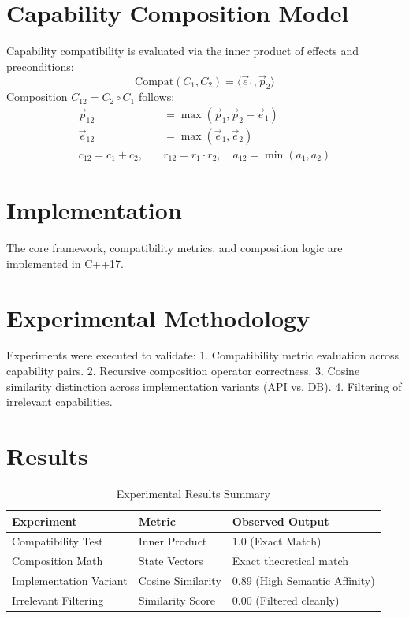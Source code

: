 \documentclass[11pt,a4paper]{article}
\begin{document}
\section{Capability Composition Model}
Capability compatibility is evaluated via the inner product of effects and preconditions:
\begin{equation}
\text{Compat}(C_1, C_2) = \langle \vec{e}_1, \vec{p}_2 \rangle
\end{equation}
Composition $C_{12} = C_2 \circ C_1$ follows:
\begin{align*}
\vec{p}_{12} &= \max(\vec{p}_1, \vec{p}_2 - \vec{e}_1) \\
\vec{e}_{12} &= \max(\vec{e}_1, \vec{e}_2) \\
c_{12} = c_1 + c_2, \quad &r_{12} = r_1 \cdot r_2, \quad a_{12} = \min(a_1, a_2)
\end{align*}

\section{Implementation}
The core framework, compatibility metrics, and composition logic are implemented in C++17.

\section{Experimental Methodology}
Experiments were executed to validate:
1. Compatibility metric evaluation across capability pairs.
2. Recursive composition operator correctness.
3. Cosine similarity distinction across implementation variants (API vs. DB).
4. Filtering of irrelevant capabilities.

\section{Results}
\begin{table}[h]
\centering
\caption{Experimental Results Summary}
\begin{tabular}{lll}
\toprule
\textbf{Experiment} & \textbf{Metric} & \textbf{Observed Output} \\
\midrule
Compatibility Test & Inner Product & 1.0 (Exact Match) \\
Composition Math & State Vectors & Exact theoretical match \\
Implementation Variant & Cosine Similarity & 0.89 (High Semantic Affinity) \\
Irrelevant Filtering & Similarity Score & 0.00 (Filtered cleanly) \\
\bottomrule
\end{tabular}
\end{table}
\end{document}
